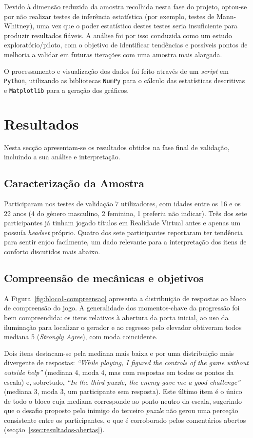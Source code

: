 \documentclass[a4paper, 12pt]{book}
\begin{document}
Devido à dimensão reduzida da amostra recolhida nesta fase do projeto, optou-se
por não realizar testes de inferência estatística (por exemplo, testes de
Mann-Whitney), uma vez que o poder estatístico
destes testes seria insuficiente para produzir resultados fiáveis. A análise
foi por isso conduzida como um estudo exploratório/piloto, com o objetivo de
identificar tendências e possíveis pontos de melhoria a validar em futuras
iterações com uma amostra mais alargada.

O processamento e visualização dos dados foi feito através de um
\textit{script} em \texttt{Python}, utilizando as bibliotecas \texttt{NumPy} para o cálculo
das estatísticas descritivas e \texttt{Matplotlib} para a geração dos
gráficos.

\section{Resultados}
\label{sec:resultados-validacao}
Nesta secção apresentam-se os resultados obtidos na fase final de validação, incluindo
a sua análise e interpretação.

\subsection{Caracterização da Amostra}
Participaram nos testes de validação 7 utilizadores, com idades entre os 16
e os 22 anos (4 do género masculino, 2 feminino, 1 preferiu não indicar).
Três dos sete participantes já tinham jogado títulos em Realidade Virtual
antes e apenas um possuía \textit{headset} próprio. Quatro dos sete
participantes reportaram ter tendência para sentir enjoo facilmente, um
dado relevante para a interpretação dos itens de conforto discutidos mais
abaixo.

\subsection{Compreensão de mecânicas e objetivos}
\label{ssec:resultados-compreensao}

A Figura~\ref{fig:bloco1-compreensao} apresenta a distribuição de respostas
ao bloco de compreensão do jogo. A generalidade dos momentos-chave da
progressão foi bem compreendida: os itens relativos à abertura da porta
inicial, ao uso da iluminação para localizar o gerador e ao regresso pelo
elevador obtiveram todos mediana 5 (\textit{Strongly Agree}), com moda
coincidente.
\par
Dois itens destacam-se pela mediana mais baixa e por uma distribuição mais
divergente de respostas: \textit{``While playing, I figured the controls of
the game without outside help''} (mediana 4, moda 4, mas com respostas em
todos os pontos da escala) e, sobretudo, \textit{``In the third puzzle, the
enemy gave me a good challenge''} (mediana 3, moda 3, um participante sem
resposta). Este último item é o único de todo o bloco cuja mediana
corresponde ao ponto neutro da escala, sugerindo que o desafio proposto
pelo inimigo do terceiro \textit{puzzle} não gerou uma perceção consistente
entre os participantes, o que é corroborado pelos comentários abertos
(secção~\ref{ssec:resultados-abertas}).
\end{document}
